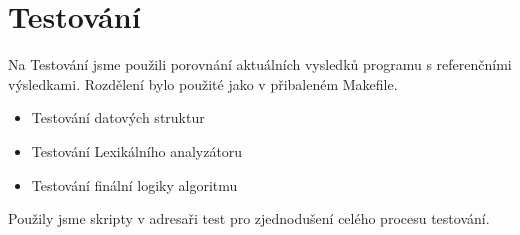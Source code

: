 \section{Testování}

Na Testování jsme použili porovnání aktuálních vysledků programu s referenčními výsledkami.
Rozdělení bylo použité jako v přibaleném Makefile.

\begin{itemize}
    \item Testování datových struktur
    \item Testování Lexikálního analyzátoru
    \item Testování finální logiky algoritmu
\end{itemize}

Použily jsme skripty v adresaři test pro zjednodušení celého procesu testování.
